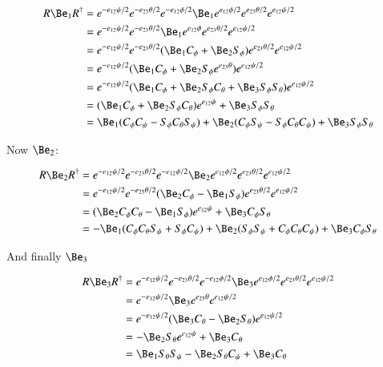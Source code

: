 \documentclass{article}
\begin{document}
\begin{align*}
R \Be_1 R^\dagger
&= 
e^{-e_{12}\psi/2} e^{-e_{23}\theta/2} e^{-e_{12}\phi/2}
\Be_1
e^{e_{12}\phi/2}
e^{e_{23}\theta/2} 
e^{e_{12}\psi/2} \\
&= 
e^{-e_{12}\psi/2} e^{-e_{23}\theta/2} 
\Be_1 e^{e_{12}\phi}
e^{e_{23}\theta/2} 
e^{e_{12}\psi/2} \\
&= 
e^{-e_{12}\psi/2} e^{-e_{23}\theta/2} 
(\Be_1 C_\phi + \Be_2 S_\phi)
e^{e_{23}\theta/2} 
e^{e_{12}\psi/2} \\
&= 
e^{-e_{12}\psi/2} 
(\Be_1 C_\phi + \Be_2 S_\phi e^{e_{23}\theta} )
e^{e_{12}\psi/2} \\
&= 
e^{-e_{12}\psi/2} 
(\Be_1 C_\phi + \Be_2 S_\phi C_\theta + \Be_3 S_\phi S_\theta )
e^{e_{12}\psi/2} \\
&= 
(\Be_1 C_\phi + \Be_2 S_\phi C_\theta ) e^{e_{12}\psi} 
+ \Be_3 S_\phi S_\theta  \\
&= 
  \Be_1 (C_\phi C_\psi - S_\phi C_\theta S_\psi)
+ \Be_2 (C_\phi S_\psi - S_\phi C_\theta C_\psi)
+ \Be_3 S_\phi S_\theta  \\
\end{align*}

Now $\Be_2$:

\begin{align*}
R \Be_2 R^\dagger
&= 
e^{-e_{12}\psi/2} e^{-e_{23}\theta/2} e^{-e_{12}\phi/2}
\Be_2
e^{e_{12}\phi/2}
e^{e_{23}\theta/2} 
e^{e_{12}\psi/2} \\
&= 
e^{-e_{12}\psi/2} e^{-e_{23}\theta/2} 
(\Be_2 C_\phi - \Be_1 S_\phi)
e^{e_{23}\theta/2} 
e^{e_{12}\psi/2} \\
&= 
(\Be_2 C_\phi C_\theta
- \Be_1 S_\phi)
e^{e_{12}\psi} 
+\Be_3 C_\phi S_\theta \\
&= 
- \Be_1 (C_\phi C_\theta S_\psi + S_\phi C_\psi)
+ \Be_2 (S_\phi S_\psi + C_\phi C_\theta C_\psi)
+ \Be_3 C_\phi S_\theta \\
\end{align*}

And finally $\Be_3$

\begin{align*}
R \Be_3 R^\dagger
&= 
e^{-e_{12}\psi/2} e^{-e_{23}\theta/2} e^{-e_{12}\phi/2}
\Be_3
e^{e_{12}\phi/2}
e^{e_{23}\theta/2} 
e^{e_{12}\psi/2} \\
&= 
e^{-e_{12}\psi/2} 
\Be_3 e^{e_{23}\theta} 
e^{e_{12}\psi/2} \\
&= 
e^{-e_{12}\psi/2} 
(
\Be_3 C_\theta
-\Be_2 S_\theta
)
e^{e_{12}\psi/2} \\
&= -\Be_2 S_\theta e^{e_{12}\psi} +\Be_3 C_\theta \\
&= 
 \Be_1 S_\theta S_\psi
-\Be_2 S_\theta C_\psi
+\Be_3 C_\theta \\
\end{align*}
\end{document}
